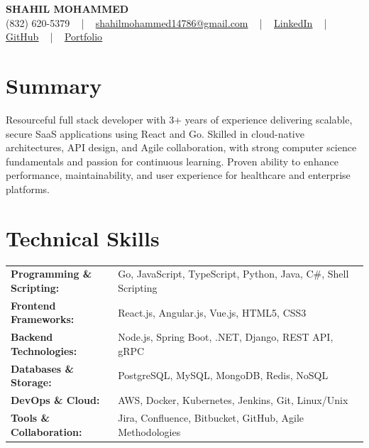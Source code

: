 \documentclass[letterpaper,11pt]{article}
\begin{document}
\begin{center}
    {\fontsize{14pt}{12pt}\selectfont \textbf{\MakeUppercase{Shahil Mohammed}}}\\ \vspace{2pt}
    \fontsize{10pt}{12pt}\selectfont (832) 620-5379 ~ | ~ \href{mailto:shahilmohammed14786@gmail.com}{shahilmohammed14786@gmail.com} ~ | ~  
    \href{https://www.linkedin.com/in/shahil-mohammed-9652931a1/}{\color{blue}\underline{LinkedIn}}  ~ | ~ 
    \href{https://github.com/freakbeast14}{\color{blue}\underline{GitHub}} ~ | ~ 
    \href{https://shahil-mohammed.netlify.app/}{\color{blue}\underline{Portfolio}}
    \vspace{-8pt}
\end{center}

\section{Summary}
\fontsize{9pt}{10pt}\selectfont
Resourceful full stack developer with 3+ years of experience delivering scalable, secure SaaS applications using React and Go. Skilled in cloud-native architectures, API design, and Agile collaboration, with strong computer science fundamentals and passion for continuous learning. Proven ability to enhance performance, maintainability, and user experience for healthcare and enterprise platforms.
 \vspace{-5pt}
 
\section{Technical Skills}
        \vspace{-14pt}
        \begin{table}[h]
            \fontsize{9pt}{10pt}\selectfont
            \begin{tabular}{p{0.3\linewidth} p{0.7\linewidth}}
                \textbf{Programming \& Scripting:} & Go, JavaScript, TypeScript, Python, Java, C\#, Shell Scripting \\
                \textbf{Frontend Frameworks:} & React.js, Angular.js, Vue.js, HTML5, CSS3 \\
                \textbf{Backend Technologies:} & Node.js, Spring Boot, .NET, Django, REST API, gRPC \\
                \textbf{Databases \& Storage:} & PostgreSQL, MySQL, MongoDB, Redis, NoSQL \\
                \textbf{DevOps \& Cloud:} & AWS, Docker, Kubernetes, Jenkins, Git, Linux/Unix \\
                \textbf{Tools \& Collaboration:} & Jira, Confluence, Bitbucket, GitHub, Agile Methodologies \\
            \end{tabular}
        \end{table}
 \vspace{-15pt}
 
\end{document}
